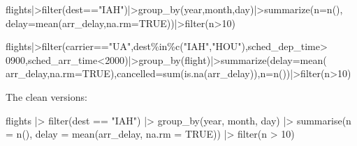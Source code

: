 \documentclass[
  letterpaper,
  DIV=11,
  numbers=noendperiod]{scrreprt}
\newenvironment{Shaded}{\begin{snugshade}}{\end{snugshade}}
\newcommand{\AttributeTok}[1]{\textcolor[rgb]{0.40,0.45,0.13}{#1}}
\newcommand{\ConstantTok}[1]{\textcolor[rgb]{0.56,0.35,0.01}{#1}}
\newcommand{\DecValTok}[1]{\textcolor[rgb]{0.68,0.00,0.00}{#1}}
\newcommand{\FunctionTok}[1]{\textcolor[rgb]{0.28,0.35,0.67}{#1}}
\newcommand{\NormalTok}[1]{\textcolor[rgb]{0.00,0.23,0.31}{#1}}
\newcommand{\SpecialCharTok}[1]{\textcolor[rgb]{0.37,0.37,0.37}{#1}}
\newcommand{\StringTok}[1]{\textcolor[rgb]{0.13,0.47,0.30}{#1}}
\begin{document}
\begin{Shaded}
\begin{Highlighting}[]
\NormalTok{flights}\SpecialCharTok{|\textgreater{}}\FunctionTok{filter}\NormalTok{(dest}\SpecialCharTok{==}\StringTok{"IAH"}\NormalTok{)}\SpecialCharTok{|\textgreater{}}\FunctionTok{group\_by}\NormalTok{(year,month,day)}\SpecialCharTok{|\textgreater{}}\FunctionTok{summarize}\NormalTok{(}\AttributeTok{n=}\FunctionTok{n}\NormalTok{(),}
                                                                  \AttributeTok{delay=}\FunctionTok{mean}\NormalTok{(arr\_delay,}\AttributeTok{na.rm=}\ConstantTok{TRUE}\NormalTok{))}\SpecialCharTok{|\textgreater{}}\FunctionTok{filter}\NormalTok{(n}\SpecialCharTok{\textgreater{}}\DecValTok{10}\NormalTok{)}

\NormalTok{flights}\SpecialCharTok{|\textgreater{}}\FunctionTok{filter}\NormalTok{(carrier}\SpecialCharTok{==}\StringTok{"UA"}\NormalTok{,dest}\SpecialCharTok{\%in\%}\FunctionTok{c}\NormalTok{(}\StringTok{"IAH"}\NormalTok{,}\StringTok{"HOU"}\NormalTok{),sched\_dep\_time}\SpecialCharTok{\textgreater{}}
                  \DecValTok{0900}\NormalTok{,sched\_arr\_time}\SpecialCharTok{\textless{}}\DecValTok{2000}\NormalTok{)}\SpecialCharTok{|\textgreater{}}\FunctionTok{group\_by}\NormalTok{(flight)}\SpecialCharTok{|\textgreater{}}\FunctionTok{summarize}\NormalTok{(}\AttributeTok{delay=}\FunctionTok{mean}\NormalTok{(}
\NormalTok{                    arr\_delay,}\AttributeTok{na.rm=}\ConstantTok{TRUE}\NormalTok{),}\AttributeTok{cancelled=}\FunctionTok{sum}\NormalTok{(}\FunctionTok{is.na}\NormalTok{(arr\_delay)),}\AttributeTok{n=}\FunctionTok{n}\NormalTok{())}\SpecialCharTok{|\textgreater{}}\FunctionTok{filter}\NormalTok{(n}\SpecialCharTok{\textgreater{}}\DecValTok{10}\NormalTok{)}
\end{Highlighting}
\end{Shaded}

The clean versions:

\begin{Shaded}
\begin{Highlighting}[]
\NormalTok{flights }\SpecialCharTok{|\textgreater{}}
  \FunctionTok{filter}\NormalTok{(dest }\SpecialCharTok{==} \StringTok{"IAH"}\NormalTok{) }\SpecialCharTok{|\textgreater{}}
  \FunctionTok{group\_by}\NormalTok{(year, month, day) }\SpecialCharTok{|\textgreater{}}
  \FunctionTok{summarise}\NormalTok{(}\AttributeTok{n =} \FunctionTok{n}\NormalTok{(), }\AttributeTok{delay =} \FunctionTok{mean}\NormalTok{(arr\_delay, }\AttributeTok{na.rm =} \ConstantTok{TRUE}\NormalTok{)) }\SpecialCharTok{|\textgreater{}}
  \FunctionTok{filter}\NormalTok{(n }\SpecialCharTok{\textgreater{}} \DecValTok{10}\NormalTok{)}
\end{Highlighting}
\end{Shaded}
\end{document}
